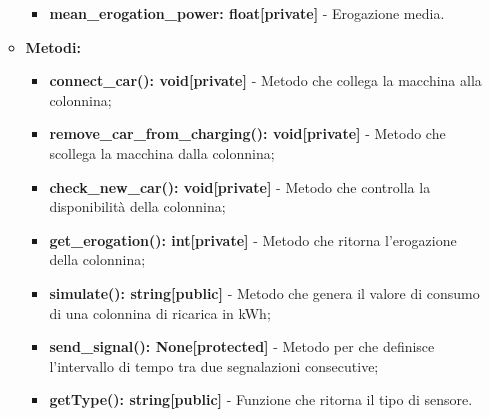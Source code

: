 \documentclass[8pt]{article}
\begin{document}
\begin{itemize}
\begin{itemize}
\begin{itemize}
            \item \textbf{mean\_erogation\_power: float[private]} - Erogazione media.
        \end{itemize}
        \item \textbf{Metodi:}
        \begin{itemize}
            \item \textbf{connect\_car(): void[private]} - Metodo che collega la macchina alla colonnina;
            \item \textbf{remove\_car\_from\_charging(): void[private]} - Metodo che scollega la macchina dalla colonnina;
            \item \textbf{check\_new\_car(): void[private]} - Metodo che controlla la disponibilità della colonnina;
            \item \textbf{get\_erogation(): int[private]} - Metodo che ritorna l'erogazione della colonnina;
            \item \textbf{simulate(): string[public]} - Metodo che genera il valore di consumo di una colonnina di ricarica in kWh;
            \item \textbf{send\_signal(): None[protected]} - Metodo per che definisce l'intervallo di tempo tra due segnalazioni consecutive;
            \item \textbf{getType(): string[public]} - Funzione che ritorna il tipo di sensore.
        \end{itemize}
    \end{itemize}
\end{itemize}
\end{document}
